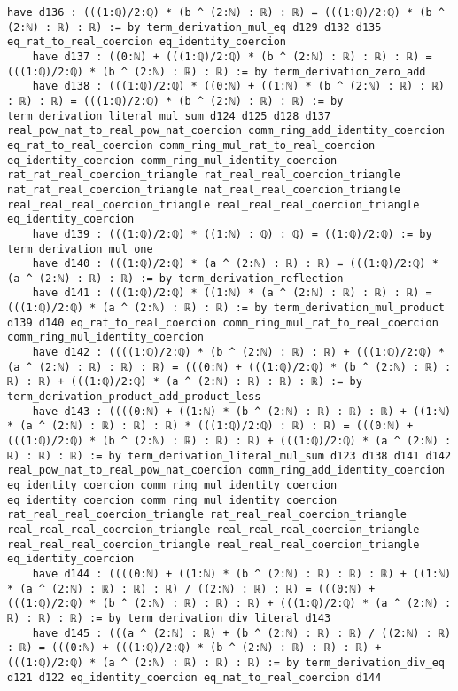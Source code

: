 \documentclass{article}
\begin{document}
\begin{tcolorbox}[colback=white!10, width=\linewidth]
\begin{lstlisting}[language=Lean4]
    have d136 : (((1:ℚ)/2:ℚ) * (b ^ (2:ℕ) : ℝ) : ℝ) = (((1:ℚ)/2:ℚ) * (b ^ (2:ℕ) : ℝ) : ℝ) := by term_derivation_mul_eq d129 d132 d135 eq_rat_to_real_coercion eq_identity_coercion
    have d137 : ((0:ℕ) + (((1:ℚ)/2:ℚ) * (b ^ (2:ℕ) : ℝ) : ℝ) : ℝ) = (((1:ℚ)/2:ℚ) * (b ^ (2:ℕ) : ℝ) : ℝ) := by term_derivation_zero_add
    have d138 : (((1:ℚ)/2:ℚ) * ((0:ℕ) + ((1:ℕ) * (b ^ (2:ℕ) : ℝ) : ℝ) : ℝ) : ℝ) = (((1:ℚ)/2:ℚ) * (b ^ (2:ℕ) : ℝ) : ℝ) := by term_derivation_literal_mul_sum d124 d125 d128 d137 real_pow_nat_to_real_pow_nat_coercion comm_ring_add_identity_coercion eq_rat_to_real_coercion comm_ring_mul_rat_to_real_coercion eq_identity_coercion comm_ring_mul_identity_coercion rat_rat_real_coercion_triangle rat_real_real_coercion_triangle nat_rat_real_coercion_triangle nat_real_real_coercion_triangle real_real_real_coercion_triangle real_real_real_coercion_triangle eq_identity_coercion
    have d139 : (((1:ℚ)/2:ℚ) * ((1:ℕ) : ℚ) : ℚ) = ((1:ℚ)/2:ℚ) := by term_derivation_mul_one
    have d140 : (((1:ℚ)/2:ℚ) * (a ^ (2:ℕ) : ℝ) : ℝ) = (((1:ℚ)/2:ℚ) * (a ^ (2:ℕ) : ℝ) : ℝ) := by term_derivation_reflection
    have d141 : (((1:ℚ)/2:ℚ) * ((1:ℕ) * (a ^ (2:ℕ) : ℝ) : ℝ) : ℝ) = (((1:ℚ)/2:ℚ) * (a ^ (2:ℕ) : ℝ) : ℝ) := by term_derivation_mul_product d139 d140 eq_rat_to_real_coercion comm_ring_mul_rat_to_real_coercion comm_ring_mul_identity_coercion
    have d142 : ((((1:ℚ)/2:ℚ) * (b ^ (2:ℕ) : ℝ) : ℝ) + (((1:ℚ)/2:ℚ) * (a ^ (2:ℕ) : ℝ) : ℝ) : ℝ) = (((0:ℕ) + (((1:ℚ)/2:ℚ) * (b ^ (2:ℕ) : ℝ) : ℝ) : ℝ) + (((1:ℚ)/2:ℚ) * (a ^ (2:ℕ) : ℝ) : ℝ) : ℝ) := by term_derivation_product_add_product_less
    have d143 : ((((0:ℕ) + ((1:ℕ) * (b ^ (2:ℕ) : ℝ) : ℝ) : ℝ) + ((1:ℕ) * (a ^ (2:ℕ) : ℝ) : ℝ) : ℝ) * (((1:ℚ)/2:ℚ) : ℝ) : ℝ) = (((0:ℕ) + (((1:ℚ)/2:ℚ) * (b ^ (2:ℕ) : ℝ) : ℝ) : ℝ) + (((1:ℚ)/2:ℚ) * (a ^ (2:ℕ) : ℝ) : ℝ) : ℝ) := by term_derivation_literal_mul_sum d123 d138 d141 d142 real_pow_nat_to_real_pow_nat_coercion comm_ring_add_identity_coercion eq_identity_coercion comm_ring_mul_identity_coercion eq_identity_coercion comm_ring_mul_identity_coercion rat_real_real_coercion_triangle rat_real_real_coercion_triangle real_real_real_coercion_triangle real_real_real_coercion_triangle real_real_real_coercion_triangle real_real_real_coercion_triangle eq_identity_coercion
    have d144 : ((((0:ℕ) + ((1:ℕ) * (b ^ (2:ℕ) : ℝ) : ℝ) : ℝ) + ((1:ℕ) * (a ^ (2:ℕ) : ℝ) : ℝ) : ℝ) / ((2:ℕ) : ℝ) : ℝ) = (((0:ℕ) + (((1:ℚ)/2:ℚ) * (b ^ (2:ℕ) : ℝ) : ℝ) : ℝ) + (((1:ℚ)/2:ℚ) * (a ^ (2:ℕ) : ℝ) : ℝ) : ℝ) := by term_derivation_div_literal d143
    have d145 : (((a ^ (2:ℕ) : ℝ) + (b ^ (2:ℕ) : ℝ) : ℝ) / ((2:ℕ) : ℝ) : ℝ) = (((0:ℕ) + (((1:ℚ)/2:ℚ) * (b ^ (2:ℕ) : ℝ) : ℝ) : ℝ) + (((1:ℚ)/2:ℚ) * (a ^ (2:ℕ) : ℝ) : ℝ) : ℝ) := by term_derivation_div_eq d121 d122 eq_identity_coercion eq_nat_to_real_coercion d144

\end{lstlisting}
\end{tcolorbox}
\end{document}
